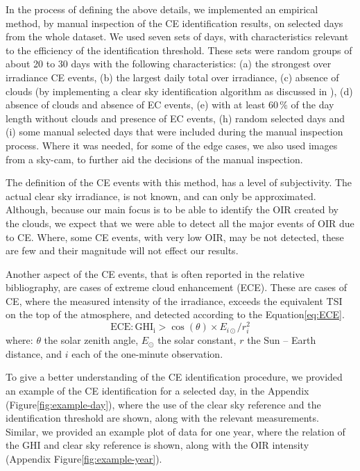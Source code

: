 \documentclass[preprint, 5p,
authoryear]{elsarticle} %
\begin{document}
In the process of defining the above details, we implemented an
empirical method, by manual inspection of the CE identification results,
on selected days from the whole dataset. We used seven sets of days,
with characteristics relevant to the efficiency of the identification
threshold. These sets were random groups of about 20 to 30 days with the
following characteristics: (a) the strongest over irradiance CE events,
(b) the largest daily total over irradiance, (c) absence of clouds (by
implementing a clear sky identification algorithm as discussed in
\citet{Natsis2023}), (d) absence of clouds and absence of EC events, (e)
with at least \(60\,\%\) of the day length without clouds and presence
of EC events, (h) random selected days and (i) some manual selected days
that were included during the manual inspection process. Where it was
needed, for some of the edge cases, we also used images from a sky-cam,
to further aid the decisions of the manual inspection.

The definition of the CE events with this method, has a level of
subjectivity. The actual clear sky irradiance, is not known, and can
only be approximated. Although, because our main focus is to be able to
identify the OIR created by the clouds, we expect that we were able to
detect all the major events of OIR due to CE. Where, some CE events,
with very low OIR, may be not detected, these are few and their
magnitude will not effect our results.

Another aspect of the CE events, that is often reported in the relative
bibliography, are cases of extreme cloud enhancement (ECE). These are
cases of CE, where the measured intensity of the irradiance, exceeds the
equivalent TSI on the top of the atmosphere, and detected according to
the Equation\nobreakspace{}\ref{eq:ECE}. \begin{equation}
\text{ECE}: \text{GHI}_\text{i} > \cos(\theta) \times E_{i\odot} / r_{i}^2
\label{eq:ECE}
\end{equation} where: \(\theta\) the solar zenith angle, \(E_{\odot}\)
the solar constant, \(r\) the Sun -- Earth distance, and \(i\) each of
the one-minute observation.

To give a better understanding of the CE identification procedure, we
provided an example of the CE identification for a selected day, in the
Appendix (Figure\nobreakspace{}\ref{fig:example-day}), where the use of
the clear sky reference and the identification threshold are shown,
along with the relevant measurements. Similar, we provided an example
plot of data for one year, where the relation of the GHI and clear sky
reference is shown, along with the OIR intensity (Appendix
Figure\nobreakspace{}\ref{fig:example-year}).
\end{document}

